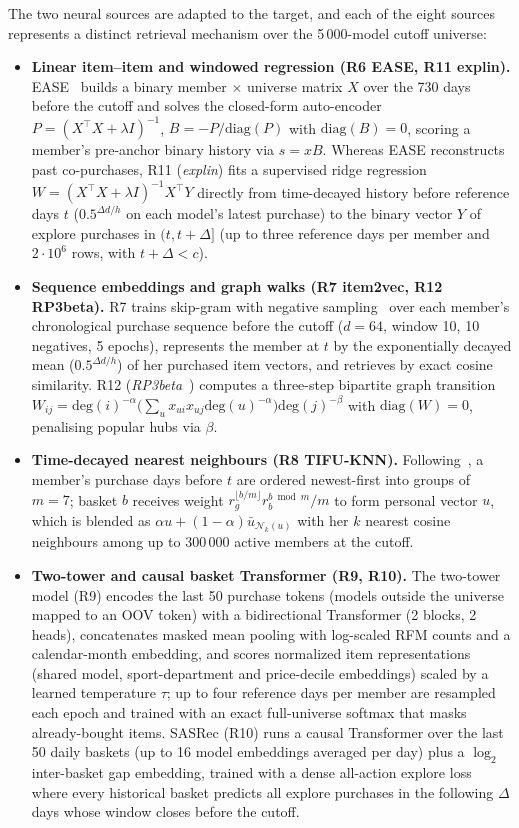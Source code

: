 \documentclass{ieeeaccess}
\begin{document}
The two neural sources are adapted to the target, and each of the eight sources represents a distinct retrieval mechanism over the
5\,000-model cutoff universe:
\begin{itemize}
\item \textbf{Linear item--item and windowed regression (R6 EASE, R11 explin).} EASE~\cite{steck2019ease} builds a binary member $\times$
universe matrix $X$ over the 730 days before the cutoff and solves the closed-form auto-encoder $P = (X^\top X + \lambda I)^{-1}$,
$B = -P / \mathrm{diag}(P)$ with $\mathrm{diag}(B) = 0$, scoring a member's pre-anchor binary history via $s = xB$. Whereas EASE
reconstructs past co-purchases, R11 (\emph{explin}) fits a supervised ridge regression $W = (X^\top X + \lambda I)^{-1} X^\top Y$ directly
from time-decayed history before reference days $t$ ($0.5^{\Delta d / h}$ on each model's latest purchase) to the binary vector $Y$ of
explore purchases in $(t, t+\Delta]$ (up to three reference days per member and $2\cdot 10^6$ rows, with $t+\Delta < c$).
\item \textbf{Sequence embeddings and graph walks (R7 item2vec, R12 RP3beta).} R7 trains skip-gram with negative sampling~\cite{barkan2016item2vec}
over each member's chronological purchase sequence before the cutoff ($d=64$, window 10, 10 negatives, 5 epochs), represents the member at $t$
by the exponentially decayed mean ($0.5^{\Delta d / h}$) of her purchased item vectors, and retrieves by exact cosine similarity. R12
(\emph{RP3beta}~\cite{paudel2017rp3beta}) computes a three-step bipartite graph transition $W_{ij} = \mathrm{deg}(i)^{-\alpha}\bigl(\sum_u x_{ui}x_{uj}\mathrm{deg}(u)^{-\alpha}\bigr)\mathrm{deg}(j)^{-\beta}$
with $\mathrm{diag}(W)=0$, penalising popular hubs via $\beta$.
\item \textbf{Time-decayed nearest neighbours (R8 TIFU-KNN).} Following~\cite{hu2020tifu}, a member's purchase days before $t$ are ordered
newest-first into groups of $m=7$; basket $b$ receives weight $r_g^{\lfloor b/m \rfloor} r_b^{b \bmod m} / m$ to form personal vector $u$,
which is blended as $\alpha u + (1-\alpha)\bar{u}_{\mathcal{N}_k(u)}$ with her $k$ nearest cosine neighbours among up to 300\,000 active members at the cutoff.
\item \textbf{Two-tower and causal basket Transformer (R9, R10).} The two-tower model (R9) encodes the last 50 purchase tokens (models outside the universe mapped to an OOV token) with a bidirectional Transformer (2 blocks, 2 heads), concatenates masked mean pooling with log-scaled RFM counts and a calendar-month embedding, and scores normalized item representations (shared model, sport-department and price-decile embeddings) scaled by a learned temperature $\tau$; up to four reference days per member are resampled each epoch and trained with an exact full-universe softmax that masks already-bought items. SASRec (R10) runs a causal Transformer over the last 50 daily baskets (up to 16 model embeddings averaged per day) plus a $\log_2$ inter-basket gap embedding, trained with a dense all-action explore loss~\cite{pancha2022pinnerformer} where every historical basket predicts all explore purchases in the following $\Delta$ days whose window closes before the cutoff.

\end{itemize}
\end{document}

